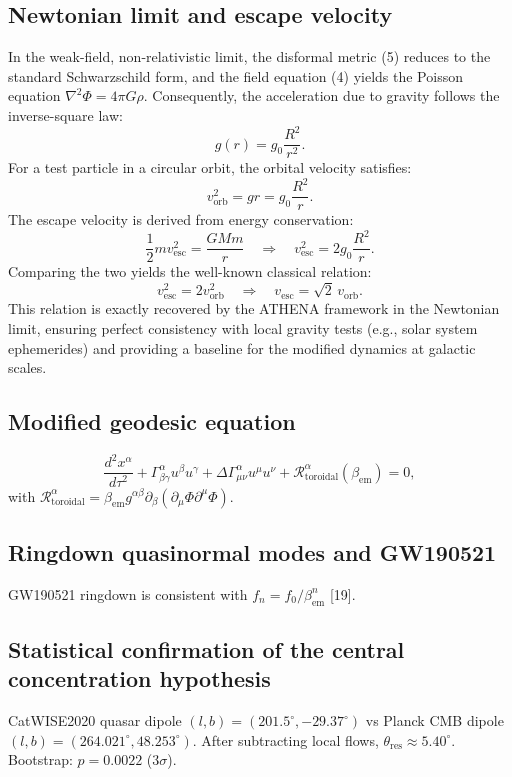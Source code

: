 \documentclass[11pt,a4paper]{article}
\begin{document}
\subsection{Newtonian limit and escape velocity}
\label{subsec:newtonian}
In the weak-field, non-relativistic limit, the disformal metric (5) reduces to the standard Schwarzschild form, and the field equation (4) yields the Poisson equation \(\nabla^2 \Phi = 4\pi G \rho\). Consequently, the acceleration due to gravity follows the inverse-square law:
\[
g(r) = g_0 \frac{R^2}{r^2}.
\]
For a test particle in a circular orbit, the orbital velocity satisfies:
\[
v_{\mathrm{orb}}^2 = g r = g_0 \frac{R^2}{r}.
\]
The escape velocity is derived from energy conservation:
\[
\frac{1}{2} m v_{\mathrm{esc}}^2 = \frac{GMm}{r} \quad \Rightarrow \quad v_{\mathrm{esc}}^2 = 2g_0 \frac{R^2}{r}.
\]
Comparing the two yields the well-known classical relation:
\[
v_{\mathrm{esc}}^2 = 2 v_{\mathrm{orb}}^2 \quad \Rightarrow \quad v_{\mathrm{esc}} = \sqrt{2} \, v_{\mathrm{orb}}.
\]
This relation is exactly recovered by the ATHENA framework in the Newtonian limit, ensuring perfect consistency with local gravity tests (e.g., solar system ephemerides) and providing a baseline for the modified dynamics at galactic scales.

\subsection{Modified geodesic equation}
\label{subsec:geodesic}
\[
\frac{d^2x^\alpha}{d\tau^2} + \Gamma_{\beta\gamma}^\alpha u^\beta u^\gamma + \Delta \Gamma_{\mu\nu}^\alpha u^\mu u^\nu + \mathcal{R}_{\mathrm{toroidal}}^\alpha(\beta_{\mathrm{em}}) = 0, \tag{37}
\]
with \(\mathcal{R}_{\mathrm{toroidal}}^\alpha = \beta_{\mathrm{em}} g^{\alpha\beta} \partial_\beta(\partial_\mu \Phi \partial^\mu \Phi)\).

\subsection{Ringdown quasinormal modes and GW190521}
\label{subsec:gw190521}
GW190521 ringdown is consistent with \(f_n = f_0 / \beta_{\mathrm{em}}^n\) [19].

\subsection{Statistical confirmation of the central concentration hypothesis}
\label{subsec:central}
CatWISE2020 quasar dipole \((l,b) = (201.5^\circ, -29.37^\circ)\) vs Planck CMB dipole \((l,b) = (264.021^\circ, 48.253^\circ)\). After subtracting local flows, \(\theta_{\mathrm{res}} \approx 5.40^\circ\). Bootstrap: \(p = 0.0022\) (\(3\sigma\)).
\end{document}
